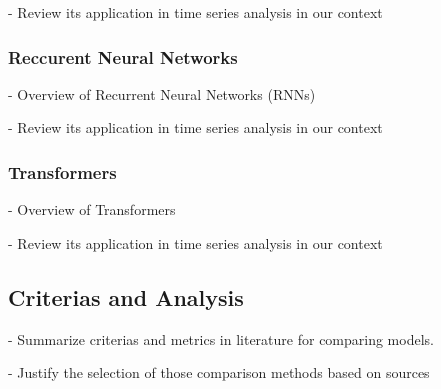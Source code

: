 \documentclass[12pt, letterpaper]{article}
\begin{document}
    - Review its application in time series analysis in our context
    \subsubsection*{Reccurent Neural Networks}
    - Overview of Recurrent Neural Networks (RNNs)

    - Review its application in time series analysis in our context
    \subsubsection*{Transformers}
    - Overview of Transformers

    - Review its application in time series analysis in our context


\subsection*{Criterias and Analysis}
- Summarize criterias and metrics in literature for comparing models.

- Justify the selection of those comparison methods based on sources
\end{document}
